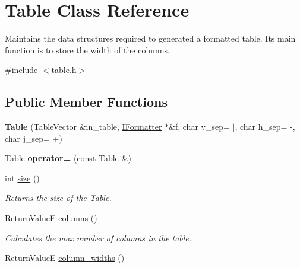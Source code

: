 \hypertarget{classTable}{}\section{Table Class Reference}
\label{classTable}


Maintains the data structures required to generated a formatted table. It\textquotesingle{}s main function is to store the width of the columns.  




{\ttfamily \#include $<$table.\+h$>$}

\subsection*{Public Member Functions}
\begin{DoxyCompactItemize}
\item 
\hypertarget{classTable_abb5d65b9ea5f69211ac4233cc09a5520}{}{\bfseries Table} (Table\+Vector \&in\+\_\+table, \hyperlink{classIFormatter}{I\+Formatter} $\ast$\&f, char v\+\_\+sep= \textquotesingle{}$\vert$\textquotesingle{}, char h\+\_\+sep= \textquotesingle{}-\/\textquotesingle{}, char j\+\_\+sep= \textquotesingle{}+\textquotesingle{})\label{classTable_abb5d65b9ea5f69211ac4233cc09a5520}

\item 
\hypertarget{classTable_a6364ca2696a5c3d2957c21ddf5ceb57d}{}\hyperlink{classTable}{Table} {\bfseries operator=} (const \hyperlink{classTable}{Table} \&)\label{classTable_a6364ca2696a5c3d2957c21ddf5ceb57d}

\item 
\hypertarget{classTable_a8f90634e34d019046c9b746d1717c2b2}{}int \hyperlink{classTable_a8f90634e34d019046c9b746d1717c2b2}{size} ()\label{classTable_a8f90634e34d019046c9b746d1717c2b2}

\begin{DoxyCompactList}\small\item\em Returns the size of the \hyperlink{classTable}{Table}. \end{DoxyCompactList}\item 
\hypertarget{classTable_a2052e3562592455c8d8a1f9239467d30}{}Return\+Value\+E \hyperlink{classTable_a2052e3562592455c8d8a1f9239467d30}{columns} ()\label{classTable_a2052e3562592455c8d8a1f9239467d30}

\begin{DoxyCompactList}\small\item\em Calculates the max number of columns in the table. \end{DoxyCompactList}\item 
\hypertarget{classTable_a07ee370d2224be5780d5a2d31b729ed9}{}Return\+Value\+E \hyperlink{classTable_a07ee370d2224be5780d5a2d31b729ed9}{column\+\_\+widths} ()\label{classTable_a07ee370d2224be5780d5a2d31b729ed9}


\end{DoxyCompactItemize}
